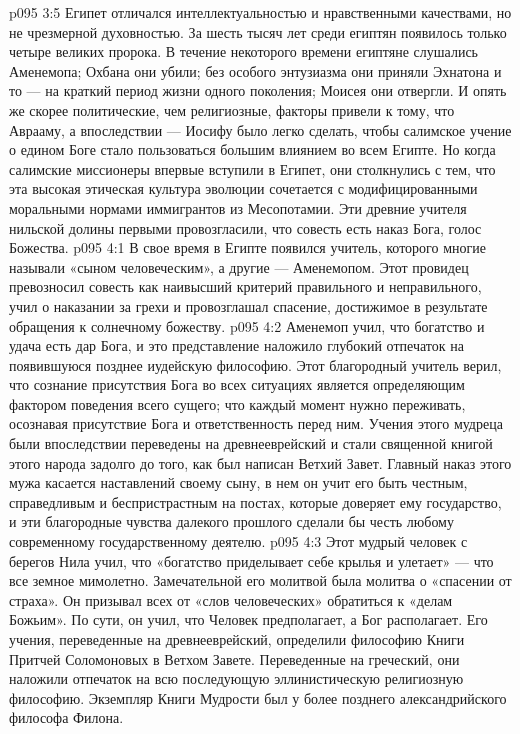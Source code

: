 \vs p095 3:5 \pc Египет отличался интеллектуальностью и нравственными качествами, но не чрезмерной духовностью. За шесть тысяч лет среди египтян появилось только четыре великих пророка. В течение некоторого времени египтяне слушались Аменемопа; Охбана они убили; без особого энтузиазма они приняли Эхнатона и то --- на краткий период жизни одного поколения; Моисея они отвергли. И опять же скорее политические, чем религиозные, факторы привели к тому, что Аврааму, а впоследствии --- Иосифу было легко сделать, чтобы салимское учение о едином Боге стало пользоваться большим влиянием во всем Египте. Но когда салимские миссионеры впервые вступили в Египет, они столкнулись с тем, что эта высокая этическая культура эволюции сочетается с модифицированными моральными нормами иммигрантов из Месопотамии. Эти древние учителя нильской долины первыми провозгласили, что совесть есть наказ Бога, голос Божества.
\vs p095 4:1 В свое время в Египте появился учитель, которого многие называли «сыном человеческим», а другие --- Аменемопом. Этот провидец превозносил совесть как наивысший критерий правильного и неправильного, учил о наказании за грехи и провозглашал спасение, достижимое в результате обращения к солнечному божеству.
\vs p095 4:2 Аменемоп учил, что богатство и удача есть дар Бога, и это представление наложило глубокий отпечаток на появившуюся позднее иудейскую философию. Этот благородный учитель верил, что сознание присутствия Бога во всех ситуациях является определяющим фактором поведения всего сущего; что каждый момент нужно переживать, осознавая присутствие Бога и ответственность перед ним. Учения этого мудреца были впоследствии переведены на древнееврейский и стали священной книгой этого народа задолго до того, как был написан Ветхий Завет. Главный наказ этого мужа касается наставлений своему сыну, в нем он учит его быть честным, справедливым и беспристрастным на постах, которые доверяет ему государство, и эти благородные чувства далекого прошлого сделали бы честь любому современному государственному деятелю.
\vs p095 4:3 Этот мудрый человек с берегов Нила учил, что «богатство приделывает себе крылья и улетает» --- что все земное мимолетно. Замечательной его молитвой была молитва о «спасении от страха». Он призывал всех от «слов человеческих» обратиться к «делам Божьим». По сути, он учил, что Человек предполагает, а Бог располагает. Его учения, переведенные на древнееврейский, определили философию Книги Притчей Соломоновых в Ветхом Завете. Переведенные на греческий, они наложили отпечаток на всю последующую эллинистическую религиозную философию. Экземпляр Книги Мудрости был у более позднего александрийского философа Филона.
